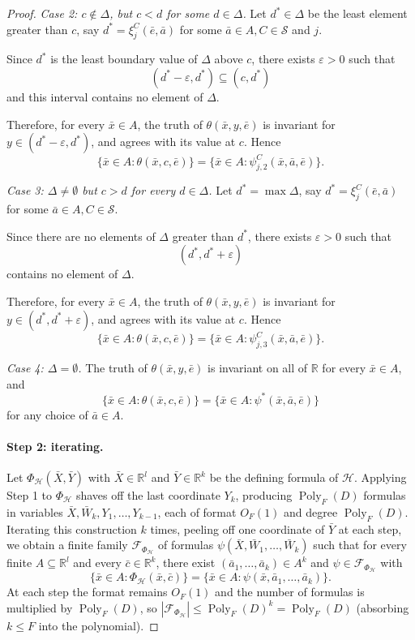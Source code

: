 \documentclass[11pt]{article}
\theoremstyle{plain}
\theoremstyle{definition}
\theoremstyle{remark}
\newcommand{\R}{\mathbb{R}}
\newcommand{\cF}{\mathcal{F}}
\newcommand{\cH}{\mathcal{H}}
\newcommand{\cS}{\mathcal{S}}
\newcommand{\Poly}{\operatorname{Poly}}
\begin{document}
\begin{proof}
\textit{Case 2: $c \notin \Delta$, but $c < d$ for some $d \in \Delta$.}
Let $d^* \in \Delta$ be the least element greater than $c$, say $d^* = \xi_j^C(\bar e, \bar a)$ for some $\bar a \in A, C \in \cS$ and $j$.

Since $d^*$ is the least boundary value of $\Delta$ above $c$, there exists $\varepsilon > 0$ such that
\[
(d^* - \varepsilon, d^*) \subseteq (c, d^*)
\]
and this interval contains no element of $\Delta$.

Therefore, for every $\bar x \in A$, the truth of $\theta(\bar x, y, \bar e)$ is invariant for $y \in (d^* - \varepsilon, d^*)$, and agrees with its value at $c$.
Hence
\[
  \{\bar x\in A:\theta(\bar x, c, \bar e)\}
  =
  \{\bar x\in A:\psi^C_{j, 2}(\bar x, \bar a, \bar e)\}.
\]

\textit{Case 3: $\Delta \neq \emptyset$ but $c > d$ for every $d \in \Delta$.}
Let $d^* = \max \Delta$, say $d^* = \xi_j^C(\bar e, \bar a)$ for some $\bar a \in A, C \in \cS$.

Since there are no elements of $\Delta$ greater than $d^*$, there exists $\varepsilon > 0$ such that
\[
(d^*, d^* + \varepsilon)
\]
contains no element of $\Delta$.

Therefore, for every $\bar x \in A$, the truth of $\theta(\bar x, y, \bar e)$ is invariant for $y \in (d^*, d^* + \varepsilon)$, and agrees with its value at $c$.
Hence
\[
  \{\bar x\in A:\theta(\bar x, c, \bar e)\}
  =
  \{\bar x\in A:\psi^C_{j, 3}(\bar x, \bar a, \bar e)\}.
\]

\textit{Case 4: $\Delta = \emptyset$.} The truth of $\theta(\bar x, y, \bar e)$ is invariant on all of $\R$ for every $\bar x \in A$, and
\[
  \{\bar x\in A:\theta(\bar x, c, \bar e)\}
  =
  \{\bar x\in A:\psi^*(\bar x, \bar a, \bar e)\}
\]
for any choice of $\bar a \in A$.

\paragraph{Step 2: iterating.}
Let $\Phi_\cH(\bar X, \bar Y)$ with $\bar X \in \R^l$ and $\bar Y \in \R^k$ be the defining formula of $\cH$. Applying Step 1 to $\Phi_\cH$ shaves off the last coordinate $Y_k$, producing $\Poly_F(D)$ formulas in variables $\bar X, \bar W_k, Y_1, \ldots, Y_{k-1}$, each of format $O_F(1)$ and degree $\Poly_F(D)$. Iterating this construction $k$ times, peeling off one coordinate of $\bar Y$ at each step, we obtain a finite family $\cF_{\Phi_\cH}$ of formulas $\psi(\bar X, \bar W_1, \ldots, \bar W_k)$ such that for every finite $A \subseteq \R^l$ and every $\bar c \in \R^k$, there exist $(\bar a_1, \ldots, \bar a_k) \in A^k$ and $\psi \in \cF_{\Phi_\cH}$ with
\[
  \{\bar x\in A:\Phi_\cH(\bar x, \bar c)\}
  =
  \{\bar x\in A:\psi(\bar x, \bar a_1, \ldots, \bar a_k)\}.
\]
At each step the format remains $O_F(1)$ and the number of formulas is multiplied by $\Poly_F(D)$, so $|\cF_{\Phi_\cH}| \le \Poly_F(D)^k = \Poly_F(D)$ (absorbing $k \le F$ into the polynomial).


\end{proof}
\end{document}
